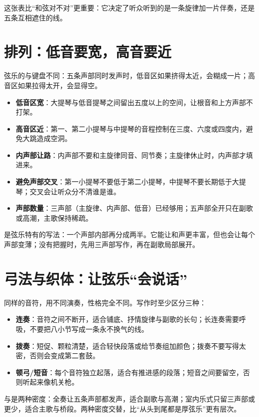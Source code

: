 这张表比“和弦对不对”更重要：它决定了听众听到的是一条旋律加一片伴奏，还是五条互相遮住的线。

\section{排列：低音要宽，高音要近}
\label{sec:string-spacing}

弦乐的与键盘不同：五条声部同时发声时，低音区如果挤得太近，会糊成一片；高音区如果拉得太开，会显得空。

\begin{itemize}
\item \textbf{低音区宽}：大提琴与低音提琴之间留出五度以上的空间，让根音和上方声部不打架。
\item \textbf{高音区近}：第一、第二小提琴与中提琴的音程控制在三度、六度或四度内，避免大跳造成空洞。
\item \textbf{内声部让路}：内声部不要和主旋律同音、同节奏；主旋律休止时，内声部才填进来。
\item \textbf{避免声部交叉}：第一小提琴不要低于第二小提琴，中提琴不要长期低于大提琴；交叉会让听众分不清谁是谁。
\item \textbf{声部数量}：三声部（主旋律、内声部、低音）已经够用；五声部全开只在副歌或高潮，主歌保持稀疏。
\end{itemize}

是弦乐特有的写法：一个声部内部再分成两半。它能让和声更丰富，但也会让每个声部变薄；没有把握时，先用三声部写作，再在副歌局部展开。

\section{弓法与织体：让弦乐“会说话”}
\label{sec:string-bowing}

同样的音符，用不同演奏，性格完全不同。写作时至少区分三种：

\begin{itemize}
\item \textbf{连奏}：音符之间不断开，适合铺底、抒情旋律与副歌的长句；长连奏需要呼吸，不要把八小节写成一条永不换气的线。
\item \textbf{拨奏}：短促、颗粒清楚，适合轻快段落或给节奏组加颜色；拨奏不要写得太密，否则会变成第二套鼓。
\item \textbf{顿弓/短音}：每个音符独立起落，适合有推进感的段落；短音之间要留空，否则听起来像机关枪。
\end{itemize}

与是两种密度：全奏让五条声部都发声，适合副歌与高潮；室内乐式只留三声部或更少，适合主歌与桥段。两种密度交替，比“从头到尾都是厚弦乐”更有层次。

